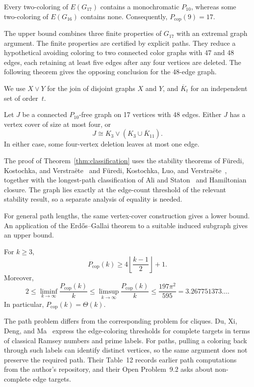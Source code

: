 \documentclass[12pt]{article}
\newcommand{\Pcop}{P_{\mathrm{cop}}}
\newcommand{\Ic}{\overline K}
\begin{document}
\begin{theorem}\label{thm:main}
Every two-coloring of $E(G_{17})$ contains a monochromatic $P_{10}$,
whereas some two-coloring of $E(G_{16})$ contains none. Consequently,
$\Pcop(9)=17$.
\end{theorem}

The upper bound combines three finite properties of $G_{17}$ with
an extremal graph argument. The finite properties are certified
by explicit paths. They reduce a hypothetical avoiding coloring
to two connected color graphs with 47 and 48 edges, each retaining
at least five edges after any four vertices are deleted.
The following theorem gives the opposing conclusion for the
48-edge graph.

We use $X\vee Y$ for the join of disjoint graphs $X$ and $Y$, and
$\Ic_t$ for an independent set of order~$t$.

\begin{theorem}\label{thm:classification}
Let $J$ be a connected $P_{10}$-free graph on 17 vertices with
48 edges. Either $J$ has a vertex cover of size at most four, or
\[
 J\cong K_3\vee(K_3\cup\Ic_{11}).
\]
In either case, some four-vertex deletion leaves at most one edge.
\end{theorem}

The proof of Theorem~\ref{thm:classification} uses the stability
theorems of F\"uredi, Kostochka, and Verstra\"ete~\cite{fkv} and
F\"uredi, Kostochka, Luo, and Verstra\"ete~\cite{fkvl}, together
with the longest-path classification of Ali and Staton~\cite{ali}
and Hamiltonian closure. The graph lies exactly at the edge-count
threshold of the relevant stability result, so a separate
analysis of equality is needed.

For general path lengths, the same vertex-cover construction
gives a lower bound. An application of the Erd\H{o}s--Gallai
theorem to a suitable induced subgraph gives an upper bound.

\begin{theorem}\label{thm:linear}
For $k\geq3$,
\[
 \Pcop(k)\geq4\left\lfloor\frac{k-1}{2}\right\rfloor+1.
\]
Moreover,
\[
 2\leq\liminf_{k\to\infty}\frac{\Pcop(k)}k
 \leq\limsup_{k\to\infty}\frac{\Pcop(k)}k
 \leq\frac{197\pi^2}{595}=3.267751373\ldots.
\]
In particular, $\Pcop(k)=\Theta(k)$.
\end{theorem}

The path problem differs from the corresponding problem for
cliques. Du, Xi, Deng, and Ma~\cite{du} express the edge-coloring
thresholds for complete targets in terms of classical Ramsey
numbers and prime labels. For paths, pulling a coloring back
through such labels can identify distinct vertices, so the
same argument does not preserve the required path.
Their Table~12 records earlier path computations from the
author's repository, and their Open Problem~9.2 asks about
non-complete edge targets.
\end{document}
